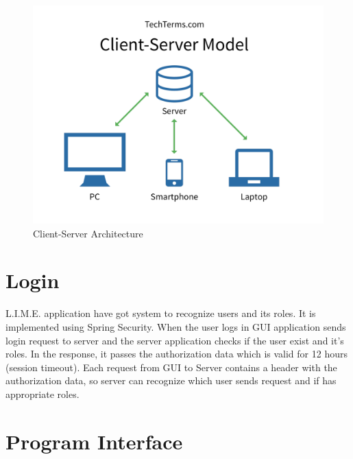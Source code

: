 \documentclass[a4paper,11pt,twoside]{report}
\theoremstyle{definition}
\begin{document}
\begin{figure}[h]

\begin{center}

\includegraphics[width=\textwidth]{CS}

\end{center}
\caption{Client-Server Architecture}
\end{figure}

\section{Login}
 L.I.M.E. application have got system to recognize users and its roles. It is implemented using Spring Security. When the user logs in GUI application sends login request to server and the server application checks if the user exist and it’s roles. In the response, it passes the authorization data which is valid for 12 hours (session timeout). Each request from GUI to Server contains a header with the authorization data, so server can recognize which user sends request and if has appropriate roles.
\section{Program Interface}
\end{document}
